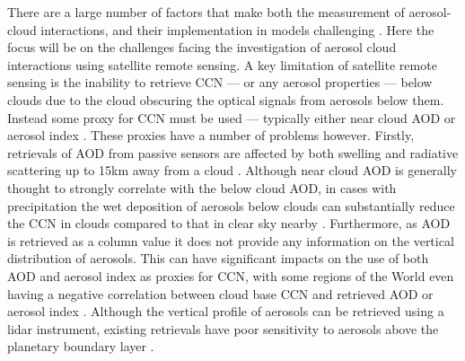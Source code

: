 There are a large number of factors that make both the measurement of aerosol-cloud interactions, and their implementation in models challenging \citep{mulmenstadt_radiative_2018}.
Here the focus will be on the challenges facing the investigation of aerosol cloud interactions using satellite remote sensing.
A key limitation of satellite remote sensing is the inability to retrieve CCN --- or any aerosol properties --- below clouds due to the cloud obscuring the optical signals from aerosols below them.
Instead some proxy for CCN must be used --- typically either near cloud AOD or aerosol index \citep{deuze_remote_2001}. These proxies have a number of problems however. 
Firstly, retrievals of AOD from passive sensors are affected by both swelling and radiative scattering up to 15km away from a cloud \citep{christensen_unveiling_2017}. 
Although near cloud AOD is generally thought to strongly correlate with the below cloud AOD, in cases with precipitation the wet deposition of aerosols below clouds can substantially reduce the CCN in clouds compared to that in clear sky nearby \citep{gryspeerdt_wet_2015}. 
Furthermore, as AOD is retrieved as a column value it does not provide any information on the vertical distribution of aerosols. 
This can have significant impacts on the use of both AOD and aerosol index as proxies for CCN, with some regions of the World even having a negative correlation between cloud base CCN and retrieved AOD or aerosol index \citep{stier_limitations_2016}. 
Although the vertical profile of aerosols can be retrieved using a lidar instrument, existing retrievals have poor sensitivity to aerosols above the planetary boundary layer \citep{watson-parris_limits_2018}.

